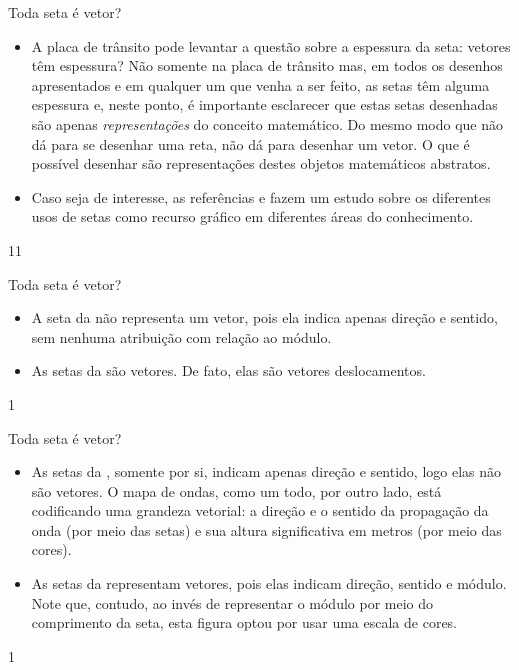 \begin{sugestions}{Toda seta é vetor?}
{
\begin{itemize}
\item {} 
A placa de trânsito pode levantar a questão sobre a espessura da seta: vetores têm espessura? Não somente na placa de trânsito mas, em todos os desenhos apresentados e em qualquer um que venha a ser feito, as setas têm alguma espessura e, neste ponto, é importante esclarecer que estas setas desenhadas são apenas \textit{representações} do conceito matemático. Do mesmo modo que não dá para se desenhar uma reta, não dá para desenhar um vetor. O que é possível desenhar são representações destes objetos matemáticos abstratos.

\item {} 
Caso seja de interesse, as referências \citep{horn1998} e \citep{wong2011} fazem um estudo sobre os diferentes usos de setas como recurso gráfico em diferentes áreas do conhecimento.

\end{itemize}
}{1}{1}
\end{sugestions}
\begin{answer}{Toda seta é vetor?}
{
\begin{itemize}
\item {} 
A seta da \hyperref[\detokenize{GE101-0C:fig-geometria-flechas-01}]{} não representa um vetor, pois ela indica apenas direção e sentido, sem nenhuma atribuição com relação ao módulo.

\item {} 
As setas da \hyperref[\detokenize{GE101-0C:fig-geometria-flechas-02}]{} são vetores. De fato, elas são vetores deslocamentos.
\end{itemize}
}{1}
\end{answer}
\clearmargin
\begin{answer}{Toda seta é vetor?}
{
\begin{itemize}
\item {} 
As setas da \hyperref[\detokenize{GE101-0C:fig-geometria-flechas-06}]{}, somente por si, indicam apenas direção e sentido, logo elas não são vetores. O mapa de ondas, como um todo, por outro lado, está codificando uma grandeza vetorial: a direção e o sentido da propagação da onda (por meio das setas) e sua altura significativa em metros (por meio das cores).

\item {} 
As setas da \hyperref[\detokenize{GE101-0C:fig-geometria-flechas-07}]{} representam vetores, pois elas indicam direção, sentido e módulo. Note que, contudo, ao invés de representar o módulo por meio do comprimento da seta, esta figura optou por usar uma escala de cores.
\end{itemize}
}{1}
\end{answer}
